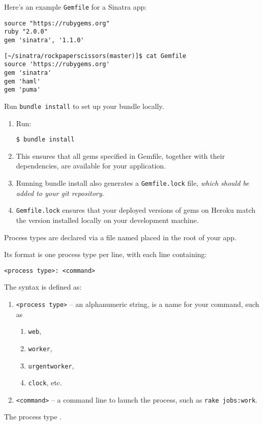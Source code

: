 Here’s an example \verb|Gemfile| for a Sinatra app:

\begin{verbatim}
source "https://rubygems.org"
ruby "2.0.0"
gem 'sinatra', '1.1.0'
\end{verbatim}

\begin{verbatim}
[~/sinatra/rockpaperscissors(master)]$ cat Gemfile
source 'https://rubygems.org'
gem 'sinatra'
gem 'haml'
gem 'puma'
\end{verbatim}

Run \verb|bundle install| to set up your bundle locally.
\begin{enumerate}
\item  Run:
\begin{verbatim}
$ bundle install
\end{verbatim}
\item 
This ensures that all gems specified in Gemfile, together with their
dependencies, are available for your application.
\item 
 Running bundle
install also generates a \verb|Gemfile.lock| file, \emph{which should be added
to your git repository}. 
\item 
\verb|Gemfile.lock| ensures that your deployed
versions of gems on Heroku match the version installed locally on
your development machine.
\end{enumerate}


\label{parrafo:procfile}

Process types are declared via a file named  placed in the
root of your app. 

Its format is one process type per line, with
each line containing:
\begin{verbatim}
<process type>: <command>
\end{verbatim}
The syntax is defined as:

\begin{enumerate}
\item 
\verb|<process type>| – an alphanumeric string, is a name for your command, such as 
  \begin{enumerate}
  \item 
  \verb|web|, 
  \item \verb|worker|, 
  \item \verb|urgentworker|, 
  \item \verb|clock|, etc.
  \end{enumerate}
\item 
\verb|<command>| – a command line to launch the process, such as \verb|rake jobs:work|.
\end{enumerate}
The  process type .


